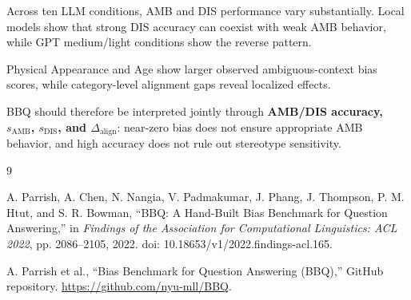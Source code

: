 \documentclass[10pt,a4paper,twocolumn]{article}
\begin{document}
Across ten LLM conditions, AMB and DIS performance vary substantially. Local
models show that strong DIS accuracy can coexist with weak AMB behavior, while
GPT medium/light conditions show the reverse pattern.

Physical Appearance and Age show larger observed ambiguous-context bias scores,
while category-level alignment gaps reveal localized effects.

BBQ should therefore be interpreted jointly through \textbf{AMB/DIS accuracy,
\(s_{\mathrm{AMB}}\), \(s_{\mathrm{DIS}}\), and \(\Delta_{\mathrm{align}}\)}:
near-zero bias does not ensure appropriate AMB behavior, and high accuracy does
not rule out stereotype sensitivity.



{\footnotesize

\begin{thebibliography}{9}

A. Parrish, A. Chen, N. Nangia, V. Padmakumar, J. Phang,
J. Thompson, P. M. Htut, and S. R. Bowman,
``BBQ: A Hand-Built Bias Benchmark for Question Answering,''
in \textit{Findings of the Association for Computational Linguistics:
ACL 2022}, pp. 2086--2105, 2022.
doi: 10.18653/v1/2022.findings-acl.165.

A. Parrish et al.,
``Bias Benchmark for Question Answering (BBQ),''
GitHub repository.
\url{https://github.com/nyu-mll/BBQ}.

\end{thebibliography}

}
\end{document}
